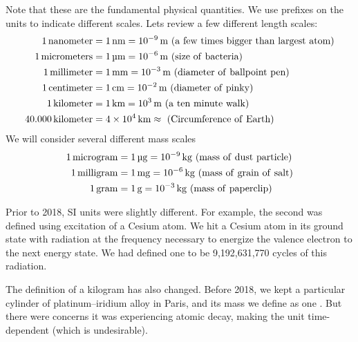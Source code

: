 \medbreak
Note that these are the fundamental physical quantities. We use
prefixes on the units to indicate different scales. Lets review a
few different length scales:
\begin{align*}
\SI{1}{nanometer} &= \SI{1}{\nano\meter} = \SI[parse-numbers = false]{10^{-9}}{\meter}\mathrm{\ (a\
few\ times\ bigger\ than\ largest\ atom)}\\
\SI{1}{micrometers}&= \SI{1}{\micro\meter} = \SI[parse-numbers = false]{10^{-6}}{\meter}\mathrm{\
(size\ of\ bacteria)}\\
\SI{1}{millimeter}&=\SI{1}{\milli\meter} = \SI[parse-numbers = false]{10^{-3}}{\meter}\mathrm{\
(diameter\ of\ ballpoint\ pen)}\\
\SI{1}{centimeter}&=\SI{1}{\centi\meter} = \SI[parse-numbers = false]{10^{-2}}{\meter}\mathrm{\
(diameter\ of\ pinky)}\\
\SI{1}{kilometer} &=\SI{1}{\kilo\meter} = \SI[parse-numbers = false]{10^{3}}{\meter}\mathrm{\ (a\
ten\ minute\ walk)}\\
\SI{40,000}{kilometer} &=\SI[parse-numbers = false]{4\times10^{4}}{\kilo\meter}\approx\mathrm{\ (Circumference\ of\ Earth)}
\end{align*}
We will consider several different mass scales
\begin{align*}
\SI{1}{microgram} &= \SI{1}{\micro\gram} = \SI[parse-numbers = false]{10^{-9}}{\kilo\gram}\mathrm{\
(mass\ of\ dust\ particle)}\\
\SI{1}{milligram} &= \SI{1}{\milli\gram} = \SI[parse-numbers = false]{10^{-6}}{\kilo\gram}\mathrm{\
(mass\ of\ grain\ of\ salt)}\\
\SI{1}{gram} &= \SI{1}{\gram} = \SI[parse-numbers = false]{10^{-3}}{\kilo\gram}\mathrm{\ (mass\
of\ paperclip)}
\end{align*}

\begin{rmk}[2018 Redefinition]
Prior to 2018, SI units were slightly different. For example, the second
was defined using excitation of a Cesium atom. We hit a Cesium
atom\index{Cesium} in its ground state with radiation at the frequency
necessary to energize the valence electron to the next energy state. We
had defined one  to be
9,192,631,770 cycles of this radiation.

The definition of a kilogram has also changed. Before 2018,
we kept a particular cylinder of platinum--iridium alloy in
Paris, and its mass we define as one \define{Kilogram}.
But there were concerns it was experiencing atomic decay,
making the unit time-dependent (which is undesirable).
\end{rmk}

